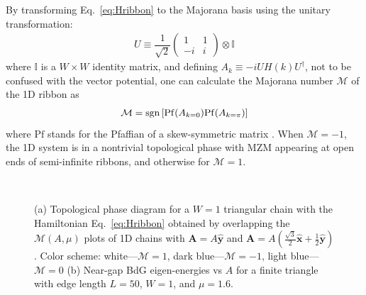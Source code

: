 \documentclass[aps,prb,showpacs,amsmath,twocolumn,amssymb,superscriptaddress]{revtex4-2}
\let\oldhat\hat
\renewcommand{\hat}[1]{\oldhat{\mathbf{#1}}}
\begin{document}
By transforming Eq.~\eqref{eq:Hribbon} to the Majorana basis using the unitary transformation:
\begin{eqnarray}
    U\equiv \dfrac{1}{\sqrt{2}} \left(
  \begin{matrix}
    1 & 1 \\
    -i & i
  \end{matrix} \right) \otimes \mathbb{I}
\end{eqnarray}
where $\mathbb{I}$ is a ${W\times W}$ identity matrix, and defining $A_k\equiv -iU H(k) U^\dag$, not to be confused with the vector potential, one can calculate the Majorana number \cite{kitaevUnpairedMajoranaFermions2001} $\mathcal{M}$ of the 1D ribbon as \cite{liTopologicalSuperconductivityInduced2014}
\begin{eqnarray}
\mathcal{M} = {\rm sgn}\left[{{\rm Pf}(A_{k=0}) {\rm Pf}(A_{k=\pi})}\right]
\end{eqnarray}
where $\text{Pf}$ stands for the Pfaffian of a skew-symmetric matrix \cite{kitaevUnpairedMajoranaFermions2001}. When $\mathcal{M} = -1$, the 1D system is in a nontrivial topological phase with MZM appearing at open ends of semi-infinite ribbons, and otherwise for $\mathcal{M} = 1$.

\begin{figure}[ht]
  \hspace{6pt}
   \\
  \vspace{-15pt}
\caption{(a) Topological phase diagram for a $W=1$ triangular chain with the Hamiltonian Eq.~\eqref{eq:Hribbon} obtained by overlapping the $\mathcal{M}(A, \mu)$ plots of 1D chains with $\mathbf A = A\hat{y}$ and $\mathbf A = A(\frac{\sqrt{3}}{2}\hat{x}+\frac{1}{2}\hat{y})$. Color scheme: white---$\mathcal{M}=1$, dark blue---$\mathcal{M}=-1$, light blue---$\mathcal{M}=0$ (b) Near-gap BdG eigen-energies vs $A$ for a finite triangle with edge length $L = 50$, $W=1$, and $\mu=1.6$.}
  \label{fig: pd}
\end{figure}
\end{document}
